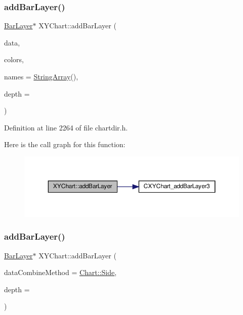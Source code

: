 \subsubsection{\texorpdfstring{add\+Bar\+Layer()}{addBarLayer()}\hspace{0.1cm}{\footnotesize\ttfamily [4/5]}}
{\footnotesize\ttfamily \hyperlink{class_bar_layer}{Bar\+Layer}$\ast$ X\+Y\+Chart\+::add\+Bar\+Layer (\begin{DoxyParamCaption}\item[{\hyperlink{class_double_array}{Double\+Array}}]{data,  }\item[{\hyperlink{class_int_array}{Int\+Array}}]{colors,  }\item[{\hyperlink{class_string_array}{String\+Array}}]{names = {\ttfamily \hyperlink{class_string_array}{String\+Array}()},  }\item[{int}]{depth = {} }\end{DoxyParamCaption})\hspace{0.3cm}{\ttfamily [inline]}}



Definition at line 2264 of file chartdir.\+h.

Here is the call graph for this function\+:
\nopagebreak
\begin{figure}[H]
\begin{center}
\leavevmode
\includegraphics[width=350pt]{class_x_y_chart_a80c3492d60a99e04c11592ed3a0f0b0c_cgraph}
\end{center}
\end{figure}
\mbox{\label{class_x_y_chart_a9d98cdb1c6a4c83bc5d9ebc697f15450}} 
\subsubsection{\texorpdfstring{add\+Bar\+Layer()}{addBarLayer()}\hspace{0.1cm}{\footnotesize\ttfamily [5/5]}}
{\footnotesize\ttfamily \hyperlink{class_bar_layer}{Bar\+Layer}$\ast$ X\+Y\+Chart\+::add\+Bar\+Layer (\begin{DoxyParamCaption}\item[{int}]{data\+Combine\+Method = {\ttfamily \hyperlink{namespace_chart_af7052bb2fea3a81e43d3812503b3b779a0ede7e5edc987730ca5957389c4e1bbc}{Chart\+::\+Side}},  }\item[{int}]{depth = {} }\end{DoxyParamCaption})\hspace{0.3cm}{\ttfamily [inline]}}



